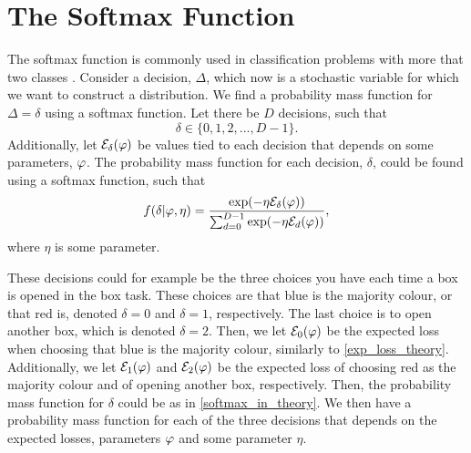\section{The Softmax Function} \label{section_theory_softmax}
The softmax function is commonly used in classification problems with more that two classes \citep{softmax}. Consider a decision, $\Delta$, which now is a stochastic variable for which we want to construct a distribution. We find a probability mass function for $\Delta=\delta$ using a softmax function. Let there be $D$ decisions, such that
\begin{equation*}
    \delta \in \{0,1,2,...,D-1\}.
\end{equation*}
Additionally, let $\mathcal{E}_{\delta}(\varphi)$ be values tied to each decision that depends on some parameters, $\varphi$. The probability mass function for each decision, $\delta$, could be found using a softmax function, such that
\begin{equation}
\label{softmax_in_theory}
    \begin{aligned}
        f(\delta|\varphi,\eta) = \frac{\text{exp}(- \eta \mathcal{E}_{\delta}(\varphi))}{\sum_{d=0}^{D-1} \text{exp}(-\eta \mathcal{E}_{d}(\varphi))},
    \end{aligned}
\end{equation}
where $\eta$ is some parameter. 


These decisions could for example be the three choices you have each time a box is opened in the box task. These choices are that blue is the majority colour, or that red is, denoted $\delta=0$ and $\delta=1$, respectively. The last choice is to open another box, which is denoted $\delta=2$. Then, we let $\mathcal{E}_0(\varphi)$ be the expected loss when choosing that blue is the majority colour, similarly to \eqref{exp_loss_theory}. Additionally, we let $\mathcal{E}_1(\varphi)$ and $\mathcal{E}_2(\varphi)$ be the expected loss of choosing red as the majority colour and of opening another box, respectively. Then, the probability mass function for $\delta$ could be as in \eqref{softmax_in_theory}. We then have a probability mass function for each of the three decisions that depends on the expected losses, parameters $\varphi$ and some parameter $\eta$.



